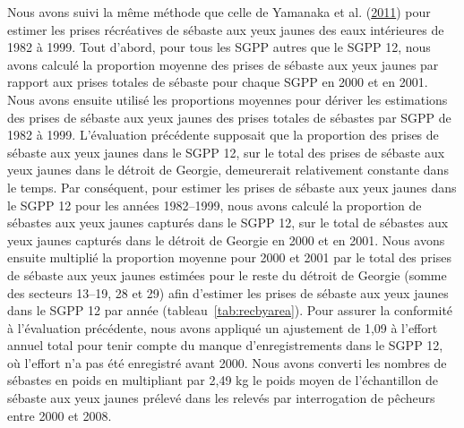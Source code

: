 \documentclass[french,11pt]{book}
\begin{document}
Nous avons suivi la même méthode que celle de Yamanaka et al. (\protect\hyperlink{ref-yamanaka2011}{2011}) pour estimer les prises récréatives de sébaste aux yeux jaunes des eaux intérieures de 1982 à 1999. Tout d'abord, pour tous les SGPP autres que le SGPP 12, nous avons calculé la proportion moyenne des prises de sébaste aux yeux jaunes par rapport aux prises totales de sébaste pour chaque SGPP en 2000 et en 2001. Nous avons ensuite utilisé les proportions moyennes pour dériver les estimations des prises de sébaste aux yeux jaunes des prises totales de sébastes par SGPP de 1982 à 1999. L'évaluation précédente supposait que la proportion des prises de sébaste aux yeux jaunes dans le SGPP 12, sur le total des prises de sébaste aux yeux jaunes dans le détroit de Georgie, demeurerait relativement constante dans le temps. Par conséquent, pour estimer les prises de sébaste aux yeux jaunes dans le SGPP 12 pour les années 1982--1999, nous avons calculé la proportion de sébastes aux yeux jaunes capturés dans le SGPP 12, sur le total de sébastes aux yeux jaunes capturés dans le détroit de Georgie en 2000 et en 2001. Nous avons ensuite multiplié la proportion moyenne pour 2000 et 2001 par le total des prises de sébaste aux yeux jaunes estimées pour le reste du détroit de Georgie (somme des secteurs 13--19, 28 et 29) afin d'estimer les prises de sébaste aux yeux jaunes dans le SGPP 12 par année (tableau~\ref{tab:recbyarea}). Pour assurer la conformité à l'évaluation précédente, nous avons appliqué un ajustement de 1,09 à l'effort annuel total pour tenir compte du manque d'enregistrements dans le SGPP 12, où l'effort n'a pas été enregistré avant 2000. Nous avons converti les nombres de sébastes en poids en multipliant par 2,49 kg le poids moyen de l'échantillon de sébaste aux yeux jaunes prélevé dans les relevés par interrogation de pêcheurs entre 2000 et 2008.
\end{document}
